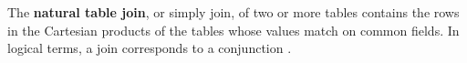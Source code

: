 \documentclass{article}
\begin{document}
 The \textbf{natural table join}, or simply join, of two or more tables contains the rows in the Cartesian products of the tables whose values match on common fields. In logical terms, a join corresponds to a conjunction \cite{Ullman1982}. 
 
 



%


\end{document}
